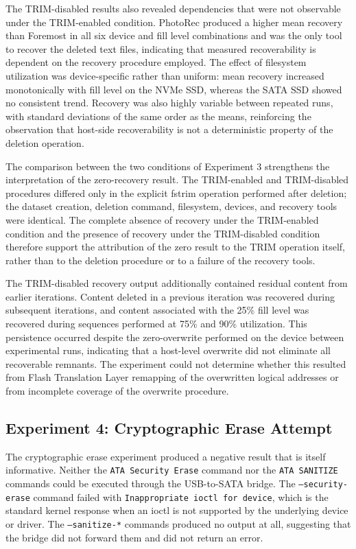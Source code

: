 The TRIM-disabled results also revealed dependencies that were not observable under the TRIM-enabled condition. PhotoRec produced a higher mean recovery than Foremost 
in all six device and fill level combinations and was the only tool to recover the deleted text files, indicating that measured recoverability is dependent on the 
recovery procedure employed. The effect of filesystem utilization was device-specific rather than uniform: mean recovery increased monotonically with fill level on the 
NVMe SSD, whereas the SATA SSD showed no consistent trend. Recovery was also highly variable between repeated runs, with standard deviations of the same order as the 
means, reinforcing the observation that host-side recoverability is not a deterministic property of the deletion operation.

The comparison between the two conditions of Experiment 3 strengthens the interpretation of the zero-recovery result. The TRIM-enabled and TRIM-disabled procedures 
differed only in the explicit fstrim operation performed after deletion; the dataset creation, deletion command, filesystem, devices, and recovery tools were identical. 
The complete absence of recovery under the TRIM-enabled condition and the presence of recovery under the TRIM-disabled condition therefore support the attribution of 
the zero result to the TRIM operation itself, rather than to the deletion procedure or to a failure of the recovery tools.

The TRIM-disabled recovery output additionally contained residual content from earlier iterations. Content deleted in a previous iteration was recovered during 
subsequent iterations, and content associated with the 25\% fill level was recovered during sequences performed at 75\% and 90\% utilization. This persistence occurred 
despite the zero-overwrite performed on the device between experimental runs, indicating that a host-level overwrite did not eliminate all recoverable remnants. The 
experiment could not determine whether this resulted from Flash Translation Layer remapping of the overwritten logical addresses or from incomplete coverage of the 
overwrite procedure.

\subsection*{Experiment 4: Cryptographic Erase Attempt}
The cryptographic erase experiment produced a negative result that is itself informative. Neither the \texttt{ATA Security Erase} command nor the \texttt{ATA SANITIZE} 
commands could be executed through the USB-to-SATA bridge. The \texttt{--security-erase} command failed with \texttt{Inappropriate ioctl for device}, which is the 
standard kernel response when an ioctl is not supported by the underlying device or driver. The \texttt{--sanitize-*} commands produced no output at all, suggesting 
that the bridge did not forward them and did not return an error.

